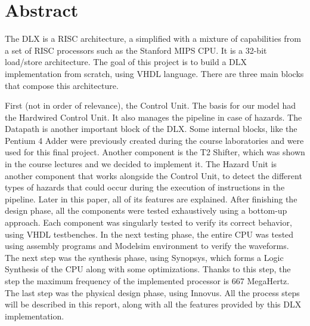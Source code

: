 %
% 
\chapter{Abstract}
\label{Abstract}


The DLX is a RISC architecture, a simplified with a mixture of capabilities from a set of RISC processors such as the Stanford MIPS CPU.
It is a 32-bit load/store architecture. The goal of this project is to build a DLX implementation
from scratch, using VHDL language. There are three main blocks that compose this architecture.

First (not in order of relevance), the Control Unit. The basis for our model had the Hardwired Control Unit. It also manages the pipeline in case of hazards.
The Datapath is another important block of the DLX. Some internal blocks, like the Pentium 4 Adder were previously created during the course laboratories
and were used for this final project. Another component is the T2 Shifter, which was shown in the course lectures and we decided to implement it.
The Hazard Unit is another component that works alongside the Control Unit, to detect the different types of hazards that could occur during the
execution of instructions in the pipeline. Later in this paper, all of its features are explained.
After finishing the design phase, all the components were tested exhaustively using a bottom-up approach.
Each component was singularly tested to verify its correct behavior, using VHDL testbenches.
In the next testing phase, the entire CPU was tested using assembly programs and Modelsim environment to verify the waveforms.
The next step was the synthesis phase, using Synopsys, which forms a Logic Synthesis of the CPU along with some optimizations. Thanks to this step, the
step the maximum frequency of the implemented processor is 667 MegaHertz.
The last step was the physical design phase, using Innovus.
All the process steps will be described in this report, along with all the features provided by this DLX implementation.


